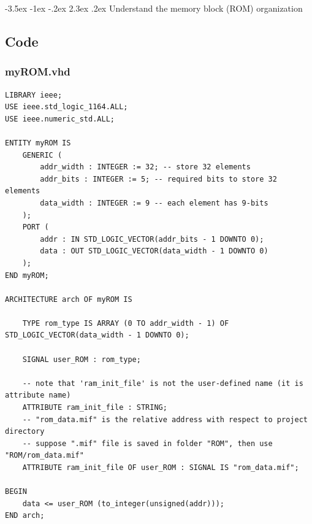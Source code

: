 \documentclass[13pt,a4paper]{report}
\makeatletter
\renewcommand\section{\@startsection {section}{1}{-1em}%
  {-3.5ex \@plus -1ex \@minus -.2ex}%
  {2.3ex \@plus.2ex}%
  {\normalfont\Large\bfseries}}
\makeatother
\begin{document}
\begin{figure}[H]
\end{figure}

\newpage
\section{Understand the memory block (ROM) organization}
\subsection{Code}
\subsubsection{myROM.vhd}
\begin{verbatim}
LIBRARY ieee;
USE ieee.std_logic_1164.ALL;
USE ieee.numeric_std.ALL;

ENTITY myROM IS
	GENERIC (
		addr_width : INTEGER := 32; -- store 32 elements
		addr_bits : INTEGER := 5; -- required bits to store 32 elements
		data_width : INTEGER := 9 -- each element has 9-bits
	);
	PORT (
		addr : IN STD_LOGIC_VECTOR(addr_bits - 1 DOWNTO 0);
		data : OUT STD_LOGIC_VECTOR(data_width - 1 DOWNTO 0)
	);
END myROM;

ARCHITECTURE arch OF myROM IS

	TYPE rom_type IS ARRAY (0 TO addr_width - 1) OF STD_LOGIC_VECTOR(data_width - 1 DOWNTO 0);

	SIGNAL user_ROM : rom_type;

	-- note that 'ram_init_file' is not the user-defined name (it is attribute name)
	ATTRIBUTE ram_init_file : STRING;
	-- "rom_data.mif" is the relative address with respect to project directory
	-- suppose ".mif" file is saved in folder "ROM", then use "ROM/rom_data.mif"
	ATTRIBUTE ram_init_file OF user_ROM : SIGNAL IS "rom_data.mif";

BEGIN
	data <= user_ROM (to_integer(unsigned(addr)));
END arch;
\end{verbatim}
\end{document}

